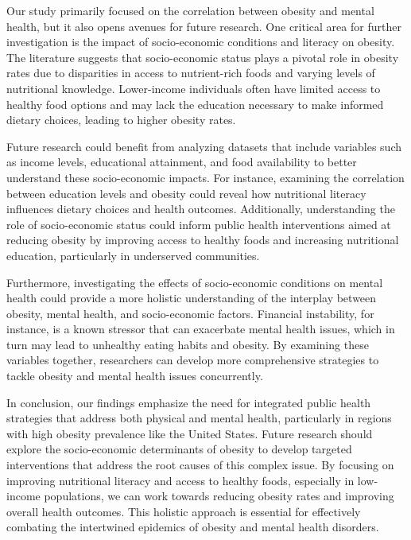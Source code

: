 \documentclass[runningheads]{llncs}
\begin{document}
Our study primarily focused on the correlation between obesity and mental health, but it also opens avenues for future research. One critical area for further investigation is the impact of socio-economic conditions and literacy on obesity. The literature suggests that socio-economic status plays a pivotal role in obesity rates due to disparities in access to nutrient-rich foods and varying levels of nutritional knowledge. Lower-income individuals often have limited access to healthy food options and may lack the education necessary to make informed dietary choices, leading to higher obesity rates.

Future research could benefit from analyzing datasets that include variables such as income levels, educational attainment, and food availability to better understand these socio-economic impacts. For instance, examining the correlation between education levels and obesity could reveal how nutritional literacy influences dietary choices and health outcomes. Additionally, understanding the role of socio-economic status could inform public health interventions aimed at reducing obesity by improving access to healthy foods and increasing nutritional education, particularly in underserved communities.

Furthermore, investigating the effects of socio-economic conditions on mental health could provide a more holistic understanding of the interplay between obesity, mental health, and socio-economic factors. Financial instability, for instance, is a known stressor that can exacerbate mental health issues, which in turn may lead to unhealthy eating habits and obesity. By examining these variables together, researchers can develop more comprehensive strategies to tackle obesity and mental health issues concurrently.

In conclusion, our findings emphasize the need for integrated public health strategies that address both physical and mental health, particularly in regions with high obesity prevalence like the United States. Future research should explore the socio-economic determinants of obesity to develop targeted interventions that address the root causes of this complex issue. By focusing on improving nutritional literacy and access to healthy foods, especially in low-income populations, we can work towards reducing obesity rates and improving overall health outcomes. This holistic approach is essential for effectively combating the intertwined epidemics of obesity and mental health disorders.



%
%
%
%


%
\end{document}

